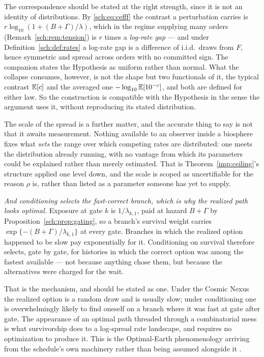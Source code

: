 The correspondence should be stated at the right strength, since it is
not an identity of distributions. By \eqref{sch:eq:cefff} the contrast a
perturbation carries is $r\log_{10}(1+(B+\Gamma)/\lambda)$, which in the
regime supplying many orders (Remark~\ref{sch:rem:tension}) is $r$ times
a \emph{log-rate gap} --- and under Definition~\ref{sch:def:rates} a
log-rate gap is a difference of i.i.d.\ draws from $F$, hence symmetric
and spread across orders with no committed sign. The companion states
the Hypothesis as uniform rather than normal. What the collapse
consumes, however, is not the shape but two functionals of it, the
typical contrast $\mathbb{E}[c]$ and the averaged one
$-\log_{10}\mathbb{E}[10^{-c}]$, and both are defined for either law. So the
construction is compatible with the Hypothesis in the sense the argument
uses it, without reproducing its stated distribution.

The scale of the spread is a further matter, and the accurate thing to say is not that it awaits measurement. Nothing available to an observer
inside a biosphere fixes what \emph{sets} the range over which competing
rates are distributed: one meets the distribution already running, with
no vantage from which its parameters could be explained rather than
merely estimated. That is Theorem~\ref{imp:ceiling}'s structure applied one
level down, and the scale is scoped as uncertifiable for the reason
$\rho$ is, rather than listed as a parameter someone has yet to
supply.

\emph{And conditioning selects the fast-correct branch, which is why the
realized path looks optimal.} Exposure at gate $k$ is $1/\lambda_{k,1}$,
paid at hazard $B+\Gamma$ by Proposition~\ref{sch:prop:gating}, so a
branch's survival weight carries $\exp\{-(B+\Gamma)/\lambda_{k,1}\}$ at
every gate. Branches in which the realized option happened to be slow
pay exponentially for it. Conditioning on survival therefore selects,
gate by gate, for histories in which the correct option was among the
fastest available --- not because anything chose them, but because the
alternatives were charged for the wait.

That is the mechanism, and should be stated as one. Under the Cosmic Nexus the
realized option is a random draw and is usually slow; under conditioning
one is overwhelmingly likely to find oneself on a branch where it was
fast at gate after gate. The appearance of an optimal path threaded
through a combinatorial mess is what survivorship does to a log-spread
rate landscape, and requires no optimization to produce it. This is the
Optimal-Earth phenomenology arriving from the schedule's own machinery
rather than being assumed alongside it \cite{Nexus,AethusOptimalEarth}.

